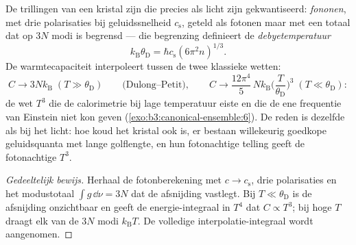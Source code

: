 \begin{theorem}\label{thm:b3:photons-phonons:debye}
De trillingen van een kristal zijn  die precies als licht
zijn gekwantiseerd: \emph{fononen}, met drie polarisaties bij
geluidssnelheid $c_{\text{s}}$, geteld als fotonen maar met een totaal dat
op $3N$ modi is begrensd --- die begrenzing definieert de
\emph{debyetemperatuur}
\[
k_{\text{B}}\theta_{\text{D}} = \hbar c_{\text{s}}
(6\pi^2n)^{1/3} .
\]
De warmtecapaciteit interpoleert tussen de twee klassieke wetten:
\[
C \to 3Nk_{\text{B}} \;(T \gg \theta_{\text{D}})
\qquad\text{(Dulong--Petit)} ,
\qquad
C \to \frac{12\pi^4}{5}\,Nk_{\text{B}}
\Big(\frac{T}{\theta_{\text{D}}}\Big)^3
\;(T \ll \theta_{\text{D}}) :
\]
de wet $T^3$ die de calorimetrie bij lage temperatuur eiste en die de ene
frequentie van Einstein niet kon geven
(\cref{exo:b3:canonical-ensemble:6}). De reden is dezelfde als bij het
licht: hoe koud het kristal ook is, er bestaan willekeurig goedkope
geluidsquanta met lange golflengte, en hun fotonachtige telling geeft de
fotonachtige $T^3$.
\end{theorem}

\begin{proof}[Gedeeltelijk bewijs]
Herhaal de fotonberekening met $c \to c_{\text{s}}$, drie polarisaties en
het modustotaal $\int g\,\dd\nu = 3N$ dat de afsnijding vastlegt. Bij $T \ll \theta_{\text{D}}$ is de afsnijding onzichtbaar en geeft de
energie-integraal in $T^4$ dat $C \propto T^3$; bij hoge $T$ draagt elk van
de $3N$ modi $k_{\text{B}}T$. De volledige interpolatie-integraal wordt
aangenomen.
\end{proof}

